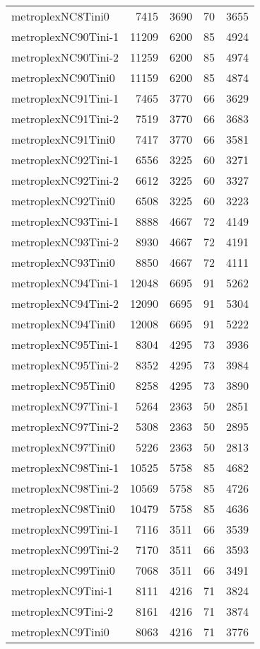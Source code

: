 \begin{longtable}{lrrrr}
metroplexNC8Tini0 & 7415 & 3690 & 70 & 3655 \\
metroplexNC90Tini-1 & 11209 & 6200 & 85 & 4924 \\
metroplexNC90Tini-2 & 11259 & 6200 & 85 & 4974 \\
metroplexNC90Tini0 & 11159 & 6200 & 85 & 4874 \\
metroplexNC91Tini-1 & 7465 & 3770 & 66 & 3629 \\
metroplexNC91Tini-2 & 7519 & 3770 & 66 & 3683 \\
metroplexNC91Tini0 & 7417 & 3770 & 66 & 3581 \\
metroplexNC92Tini-1 & 6556 & 3225 & 60 & 3271 \\
metroplexNC92Tini-2 & 6612 & 3225 & 60 & 3327 \\
metroplexNC92Tini0 & 6508 & 3225 & 60 & 3223 \\
metroplexNC93Tini-1 & 8888 & 4667 & 72 & 4149 \\
metroplexNC93Tini-2 & 8930 & 4667 & 72 & 4191 \\
metroplexNC93Tini0 & 8850 & 4667 & 72 & 4111 \\
metroplexNC94Tini-1 & 12048 & 6695 & 91 & 5262 \\
metroplexNC94Tini-2 & 12090 & 6695 & 91 & 5304 \\
metroplexNC94Tini0 & 12008 & 6695 & 91 & 5222 \\
metroplexNC95Tini-1 & 8304 & 4295 & 73 & 3936 \\
metroplexNC95Tini-2 & 8352 & 4295 & 73 & 3984 \\
metroplexNC95Tini0 & 8258 & 4295 & 73 & 3890 \\
metroplexNC97Tini-1 & 5264 & 2363 & 50 & 2851 \\
metroplexNC97Tini-2 & 5308 & 2363 & 50 & 2895 \\
metroplexNC97Tini0 & 5226 & 2363 & 50 & 2813 \\
metroplexNC98Tini-1 & 10525 & 5758 & 85 & 4682 \\
metroplexNC98Tini-2 & 10569 & 5758 & 85 & 4726 \\
metroplexNC98Tini0 & 10479 & 5758 & 85 & 4636 \\
metroplexNC99Tini-1 & 7116 & 3511 & 66 & 3539 \\
metroplexNC99Tini-2 & 7170 & 3511 & 66 & 3593 \\
metroplexNC99Tini0 & 7068 & 3511 & 66 & 3491 \\
metroplexNC9Tini-1 & 8111 & 4216 & 71 & 3824 \\
metroplexNC9Tini-2 & 8161 & 4216 & 71 & 3874 \\
metroplexNC9Tini0 & 8063 & 4216 & 71 & 3776 \\
\end{longtable}
